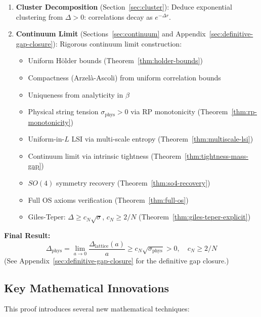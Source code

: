 \begin{enumerate}[label=\textbf{Step \arabic*:}]
\item \textbf{Cluster Decomposition} (Section~\ref{sec:cluster}): 
Deduce exponential clustering from $\Delta > 0$: correlations decay as $e^{-\Delta r}$.

\item \textbf{Continuum Limit} (Sections~\ref{sec:continuum} and Appendix~\ref{sec:definitive-gap-closure}): 
Rigorous continuum limit construction:
\begin{itemize}
\item Uniform Hölder bounds (Theorem~\ref{thm:holder-bounds})
\item Compactness (Arzelà-Ascoli) from uniform correlation bounds
\item Uniqueness from analyticity in $\beta$
\item Physical string tension $\sigma_{\text{phys}} > 0$ via RP monotonicity (Theorem~\ref{thm:rp-monotonicity})
\item Uniform-in-$L$ LSI via multi-scale entropy (Theorem~\ref{thm:multiscale-lsi})
\item Continuum limit via intrinsic tightness (Theorem~\ref{thm:tightness-mass-gap})
\item $SO(4)$ symmetry recovery (Theorem~\ref{thm:so4-recovery})
\item Full OS axioms verification (Theorem~\ref{thm:full-os})
\item Giles-Teper: $\Delta \geq c_N\sqrt{\sigma}$, $c_N \geq 2/N$ (Theorem~\ref{thm:giles-teper-explicit})
\end{itemize}
\end{enumerate}

\textbf{Final Result:}
\[
\boxed{\Delta_{\mathrm{phys}} = \lim_{a \to 0} \frac{\Delta_{\text{lattice}}(a)}{a} \geq c_N \sqrt{\sigma_{\text{phys}}} > 0, \quad c_N \geq 2/N}
\]
(See Appendix~\ref{sec:definitive-gap-closure} for the definitive gap closure.)

\subsection{Key Mathematical Innovations}

This proof introduces several new mathematical techniques:

